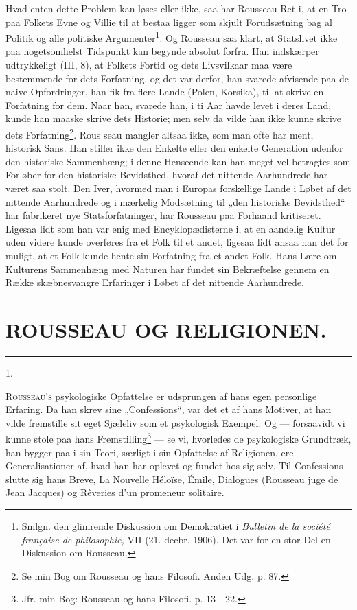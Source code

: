 \documentclass[12pt,a4paper,openany]{book}
\newcommand{\opage}[1]{\marginnote{\footnotesize\textit{[#1]}}}
\newcommand{\essay}[2][]{\chapter*{#2}\addcontentsline{toc}{chapter}{#1}}   %
\newcommand{\streg}{\begin{center}\rule{3em}{0.4pt}\end{center}}
\begin{document}
Hvad enten dette Problem kan løses eller ikke, saa har
Rousseau Ret i, at en Tro paa Folkets Evne og Villie til at
bestaa ligger som skjult Forudsætning bag al Politik og alle
politiske Argumenter\footnote[1]{Smlgn. den glimrende Diskussion om Demokratiet i \textit{Bulletin de la société française de philosophie,} VII (21. decbr. 1906). Det var for en stor Del en Diskussion om Rousseau.}. Og Rousseau saa klart, at Statslivet
ikke paa nogetsomhelst Tidspunkt kan begynde absolut forfra.
Han indskærper udtrykkeligt (III, 8), at Folkets Fortid og dets
Livsvilkaar maa være bestemmende for dets Forfatning, og det
var derfor, han svarede afvisende paa de naive Opfordringer,
han fik fra flere Lande (Polen, Korsika), til at skrive en Forfatning
for dem. Naar han, svarede han, i ti Aar havde levet
i deres Land, kunde han maaske skrive dets Historie; men
selv da vilde han ikke kunne skrive dets Forfatning\footnote[2]{Se min Bog om Rousseau og hans Filosofi. Anden Udg. p. 87.}. Rous%
\setcounter{footnote}{0}%
\opage{141}seau mangler altsaa ikke, som man ofte har ment, historisk
Sans. Han stiller ikke den Enkelte eller den enkelte Generation
udenfor den historiske Sammenhæng; i denne Henseende
kan han meget vel betragtes som Forløber for den historiske
Bevidsthed, hvoraf det nittende Aarhundrede har været saa
stolt. Den Iver, hvormed man i Europas forskellige Lande i
Løbet af det nittende Aarhundrede og i mærkelig Modsætning
til „den historiske Bevidsthed“ har fabrikeret nye Statsforfatninger,
har Rousseau paa Forhaand kritiseret. Ligesaa lidt som
han var enig med Encyklopædisterne i, at en aandelig Kultur
uden videre kunde overføres fra et Folk til et andet, ligesaa
lidt ansaa han det for muligt, at et Folk kunde hente sin Forfatning
fra et andet Folk. Hans Lære om Kulturens Sammenhæng
med Naturen har fundet sin Bekræftelse gennem en
Række skæbnesvangre Erfaringer i Løbet af det nittende Aarhundrede.


\setcounter{footnote}{0}%
\opage{142}\essay[Rousseau og Religionen (1912)]{ROUSSEAU OG RELIGIONEN.}
\streg

\begin{center}1.\end{center}

R\textsc{ousseau’s} psykologiske Opfattelse er udsprungen af hans
egen personlige Erfaring. Da han skrev sine „Confessions“,
var det et af hans Motiver, at han vilde fremstille sit
eget Sjæleliv som et psykologisk Exempel. Og --- forsaavidt
vi kunne stole paa hans Fremstilling\footnote[1]{Jfr. min Bog: Rousseau og hans Filosofi. p. 13---22.} --- se vi, hvorledes de
psykologiske Grundtræk, han bygger paa i sin Teori, særligt i
sin Opfattelse af Religionen, ere Generalisationer af, hvad han
har oplevet og fundet hos sig selv. Til Confessions slutte sig
hans Breve, La Nouvelle Héloïse, Émile, Dialogues (Rousseau
juge de Jean Jacques) og Rêveries d’un promeneur solitaire.
\end{document}
